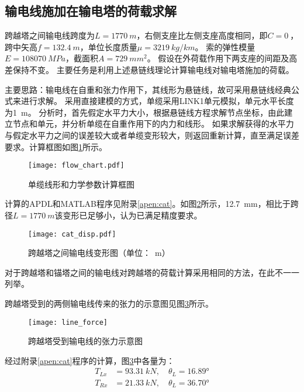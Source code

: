 \subsection{输电线施加在输电塔的荷载求解}

跨越塔之间输电线跨度为$L=\SI{1770}{m}$，右侧支座比左侧支座高度相同，即$C=\SI{0}{}$，跨中矢高$f=\SI{132.4}{m}$，单位长度质量$\mu=\SI{3219}{kg/km}$。
索的弹性模量$E=\SI{108070}{MPa}$，截面积$A=\SI{729}{mm^2}$。
假设在外荷载作用下两支座的间距及高差保持不变。
主要任务是利用上述悬链线理论计算输电线对输电塔施加的荷载。

主要思路：输电线在自重和张力作用下，其线形为悬链线，故可采用悬链线经典公式来进行求解。
采用直接建模的方式，单缆采用LINK1单元模拟，单元水平长度为\SI{1}{m}。
分析时，首先假定水平力大小，根据悬链线方程求解节点坐标，由此建立节点和单元，并分析单缆在自重作用下的内力和线形。
如果求解获得的水平力与假定水平力之间的误差较大或者单缆变形较大，则返回重新计算，直至满足误差要求。计算框图如图\ref{fig:flow-chart}所示。
\begin{figure}[!htpb]
\centering
\texttt{[image: flow\_chart.pdf]}
\caption{单缆线形和力学参数计算框图}
\label{fig:flow-chart}
\end{figure}

计算的APDL和MATLAB程序见附录\ref{apen:cat}。如图\ref{fig:cat-disp}所示，\SI{12.7}{mm}，相比于跨径$L=\SI{1770}{m}$该变形已足够小，认为已满足精度要求。

\begin{figure}[!htbp]
\centering
\texttt{[image: cat\_disp.pdf]}
\caption{跨越塔之间输电线变形图（单位：\SI{}{m}）}
\label{fig:cat-disp}
\end{figure}

对于跨越塔和锚塔之间的输电线对跨越塔的荷载计算采用相同的方法，在此不一一列举。

跨越塔受到的两侧输电线传来的张力的示意图见图\ref{fig:line-force}所示。

\begin{figure}[!htbp]
\centering
\texttt{[image: line\_force]}
\caption{跨越塔受到输电线的张力示意图}
\label{fig:line-force}
\end{figure}

经过附录\ref{apen:cat}程序的计算，图\ref{fig:line-force}中各量为：
\begin{equation}
\begin{split}
  T_{Lx} & = \SI{93.31}{kN},\quad \theta_L  = \ang{16.89} \\
  T_{Rx} & = \SI{21.33}{kN},\quad \theta_L  = \ang{36.70}
\end{split}
\end{equation}



